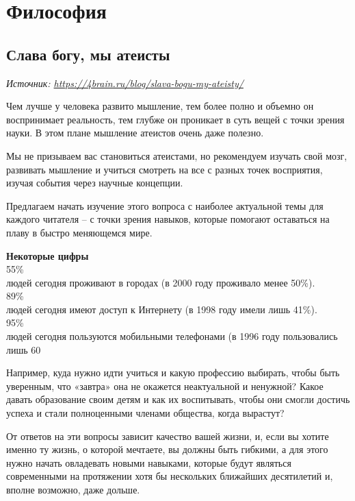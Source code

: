 \chapter{Философия}

\section{Слава богу, мы атеисты}

\textit{Источник: \url{https://4brain.ru/blog/slava-bogu-my-ateisty/}}

Чем лучше у человека развито мышление, тем более полно и объемно он воспринимает реальность, тем глубже он проникает в суть вещей с точки зрения науки. В этом плане мышление атеистов очень даже полезно.

Мы не призываем вас становиться атеистами, но рекомендуем изучать свой мозг, развивать мышление и учиться смотреть на все с разных точек восприятия, изучая события через научные концепции.

Предлагаем начать изучение этого вопроса с наиболее актуальной темы для каждого читателя – с точки зрения навыков, которые помогают оставаться на плаву в быстро меняющемся мире.

\begin{fancyquotes}
    \textbf{Некоторые цифры}\\

    {\Huge 55\%}\\
    людей сегодня проживают в городах (в 2000 году проживало менее 50\%).\\[1em]

    {\Huge 89\%}\\
    людей сегодня имеют доступ к Интернету (в 1998 году имели лишь 41\%).\\[1em]

    {\Huge 95\%}\\
    людей сегодня пользуются мобильными телефонами (в 1996 году пользовались лишь 60%

\end{fancyquotes}

Например, куда нужно идти учиться и какую профессию выбирать, чтобы быть уверенным, что «завтра» она не окажется неактуальной и ненужной? Какое давать образование своим детям и как их воспитывать, чтобы они смогли достичь успеха и стали полноценными членами общества, когда вырастут?

От ответов на эти вопросы зависит качество вашей жизни, и, если вы хотите именно ту жизнь, о которой мечтаете, вы должны быть гибкими, а для этого нужно начать овладевать новыми навыками, которые будут являться современными на протяжении хотя бы нескольких ближайших десятилетий и, вполне возможно, даже дольше.


